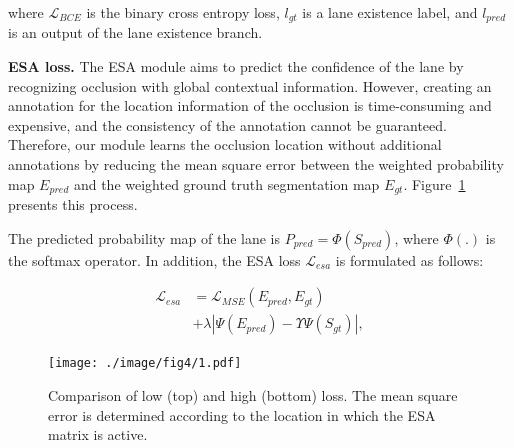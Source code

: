 \documentclass[10pt,twocolumn,letterpaper]{article}
\begin{document}
\noindent
where $\mathcal{L}_{BCE}$ is the binary cross entropy loss, $l_{gt}$ is a lane existence label, and $l_{pred}$ is an output of the lane existence branch.

\noindent
\textbf{ESA loss.} The ESA module aims to predict the confidence of the lane by recognizing occlusion with global contextual information. However, creating an annotation for the location information of the occlusion is time-consuming and expensive, and the consistency of the annotation cannot be guaranteed. Therefore, our module learns the occlusion location without additional annotations by reducing the mean square error between the weighted probability map $E_{pred}$ and the weighted ground truth segmentation map $E_{gt}$. Figure~\ref{fig:mse} presents this process. 

The predicted probability map of the lane is $P_{pred}=\Phi\left(S_{pred}\right)$, where $\Phi(.)$ is the softmax operator. In addition, the ESA loss $\mathcal{L}_{esa}$ is formulated as follows:

\begin{equation}
	\begin{split}
		\mathcal{L}_{esa} &=\mathcal{L}_{MSE}\left(E_{pred},E_{gt}\right)\\
		&+\lambda\left|\Psi\left(E_{pred}\right)-\Upsilon\Psi\left(S_{gt}\right)\right|,
		\label{eq:three}
	\end{split}
\end{equation}

\begin{figure}
	\setlength{\belowcaptionskip}{-24pt}
	\begin{center}
		\subfloat
		{\texttt{[image: ./image/fig4/1.pdf]}}\,
		\\[-1.5ex]
		\caption{Comparison of low (top) and high (bottom) loss. The mean square error is determined according to the location in which the ESA matrix is active.}
		\label{fig:mse}
	\end{center}
\end{figure}
\end{document}
